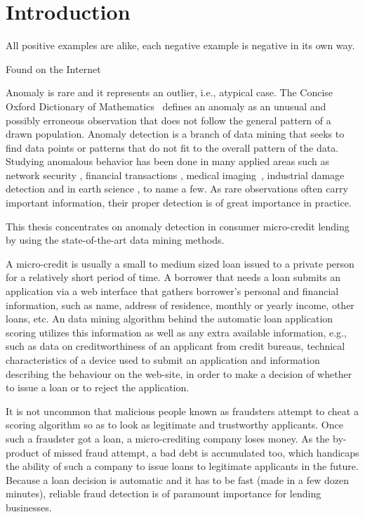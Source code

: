 
\chapter{Introduction}
\epigraph{All positive examples are
alike, each negative example
is negative in its own way.}{Found on the Internet}
\label{intro}

Anomaly is rare and it represents an outlier, i.e., atypical case. The Concise Oxford Dictionary of Mathematics~\cite{Clapham:2013} defines an anomaly as an unusual and possibly erroneous observation that does not follow the general pattern of a drawn population. Anomaly detection is a branch of data mining that seeks to find data points or patterns that do not fit to the overall pattern of the data. Studying anomalous behavior has been done in many applied areas such as network security \cite{Peddabachigari:2007}, financial transactions \cite{Eskin:2010,Ahmed:2015}, medical imaging~\cite{Spence:2001:DSC:882464.882797}, industrial damage detection \cite{Hollier:Austin:2002} and in earth science \cite{Das:2009:ADS:1601966.1601989}, to name a few. As rare observations often carry important information, their proper detection is of great importance in practice. 

This thesis concentrates on anomaly detection in consumer micro-credit lending by using the state-of-the-art data mining methods. 

A micro-credit is usually a small to medium sized loan issued to a private person for a relatively short period of time. A borrower that needs a loan submits an application via a web interface that gathers borrower's personal and financial information, such as name, address of residence, monthly or yearly income, other loans, etc. An data mining algorithm behind the automatic loan application scoring utilizes this information as well as any extra available information, e.g., such as data on creditworthiness of an applicant from credit bureaus, technical characteristics of a device used to submit an application and information describing the behaviour on the web-site, in order to make a decision of whether to issue a loan or to reject the application. 

It is not uncommon that malicious people known as fraudsters attempt to cheat a scoring algorithm so as to look as legitimate and trustworthy applicants. Once such a fraudster got a loan, a  micro-crediting company loses money. As the by-product of missed fraud attempt, a bad debt is accumulated too, which handicaps the ability of such a company to issue loans to legitimate applicants in the future. Because a loan decision is automatic and it has to be fast (made in a few dozen minutes), reliable fraud detection is of paramount importance for lending businesses. 

